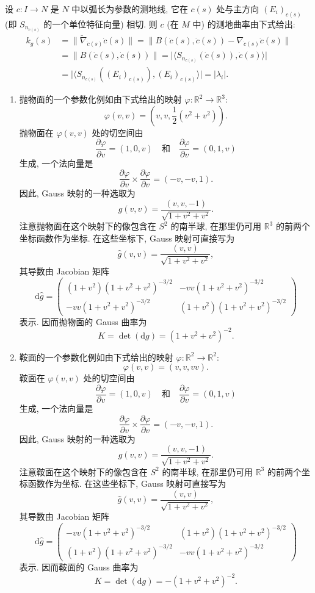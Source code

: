 \begin{description}[font=\normalfont,leftmargin=2em,labelwidth=1.5em]
设 $c:I\to N$ 是 $N$ 中以弧长为参数的测地线, 它在 $c(s)$ 处与主方向 $(E_i)_{c(s)}$ (即 $S_{n_{c(s)}}$ 的一个单位特征向量) 相切. 则 $c$ (在 $M$ 中) 的测地曲率由下式给出:
\begin{align*}
  k_g(s)&=\lVert\widetilde\nabla_{\dot c(s)}\dot c(s)\rVert
     =\lVert B(\dot c(s),\dot c(s))-\nabla_{\dot c(s)}\dot c(s)\rVert\\
  &=\lVert B(\dot c(s),\dot c(s))\rVert
    =\bigl|\langle S_{n_{c(s)}}(\dot c(s)),\dot c(s)\rangle\bigr|\\
  &=\bigl|\langle S_{n_{c(s)}}((E_i)_{c(s)}),(E_i)_{c(s)}\rangle\bigr|
    =|\lambda_i|.
\end{align*}

\begin{enumerate}[label=(\alph*),ref=\alph*,leftmargin=*]
\item 抛物面的一个参数化例如由下式给出的映射 $\varphi:\mathbb{R}^2\to\mathbb{R}^3$:
\[
  \varphi(v,v)=\left(v,v,\frac12(v^2+v^2)\right).
\]
抛物面在 $\varphi(v,v)$ 处的切空间由
\[
  \frac{\partial\varphi}{\partial v}=(1,0,v)
   \quad\text{和}\quad\frac{\partial\varphi}{\partial v}=(0,1,v)
\]
生成, 一个法向量是
\[
  \frac{\partial\varphi}{\partial v}\times\frac{\partial\varphi}{\partial v}=(-v,-v,1).
\]
因此, Gauss 映射的一种选取为
\[
  g(v,v)=\frac{(v,v,-1)}{\sqrt{1+v^2+v^2}}.
\]
注意抛物面在这个映射下的像包含在 $S^2$ 的南半球, 在那里仍可用 $\mathbb{R}^3$ 的前两个坐标函数作为坐标. 在这些坐标下, Gauss 映射可直接写为
\[
  \widehat g(v,v)=\frac{(v,v)}{\sqrt{1+v^2+v^2}},
\]
其导数由 Jacobian 矩阵
\[
  \mathrm{d}\widehat g=\begin{pmatrix}
  (1+v^2)(1+v^2+v^2)^{-3/2}&-vv(1+v^2+v^2)^{-3/2}\\
  -vv(1+v^2+v^2)^{-3/2}&(1+v^2)(1+v^2+v^2)^{-3/2}
  \end{pmatrix}
\]
表示. 因而抛物面的 Gauss 曲率为
\[
  K=\det(\mathrm{d}g)=(1+v^2+v^2)^{-2}.
\]
\item 鞍面的一个参数化例如由下式给出的映射 $\varphi:\mathbb{R}^2\to\mathbb{R}^2$:
\[
  \varphi(v,v)=(v,v,vv).
\]
鞍面在 $\varphi(v,v)$ 处的切空间由
\[
  \frac{\partial\varphi}{\partial v}=(1,0,v)
   \quad\text{和}\quad\frac{\partial\varphi}{\partial v}=(0,1,v)
\]
生成, 一个法向量是
\[
  \frac{\partial\varphi}{\partial v}\times\frac{\partial\varphi}{\partial v}=(-v,-v,1).
\]
因此, Gauss 映射的一种选取为
\[
  g(v,v)=\frac{(v,v,-1)}{\sqrt{1+v^2+v^2}}.
\]
注意鞍面在这个映射下的像包含在 $S^2$ 的南半球, 在那里仍可用 $\mathbb{R}^3$ 的前两个坐标函数作为坐标. 在这些坐标下, Gauss 映射可直接写为
\[
  \widehat g(v,v)=\frac{(v,v)}{\sqrt{1+v^2+v^2}},
\]
其导数由 Jacobian 矩阵
\[
  \mathrm{d}\widehat g=\begin{pmatrix}
  -vv(1+v^2+v^2)^{-3/2}&(1+v^2)(1+v^2+v^2)^{-3/2}\\
  (1+v^2)(1+v^2+v^2)^{-3/2}&-vv(1+v^2+v^2)^{-3/2}
  \end{pmatrix}
\]
表示. 因而鞍面的 Gauss 曲率为
\[
  K=\det(\mathrm{d}g)=-(1+v^2+v^2)^{-2}.
\]
\end{enumerate}
\end{description}
